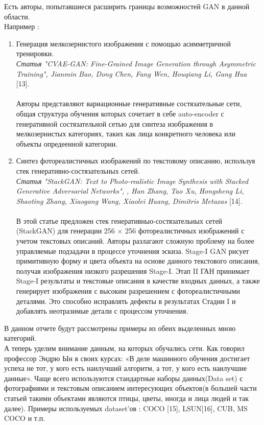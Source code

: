 \documentclass{article}
\begin{document}
    Есть авторы, попытавшиеся расширить границы возможностей GAN в данной области. \\ Например :
\begin{enumerate} 
\item Генерация мелкозернистого изображения с помощью асимметричной тренировки. \\ 
    \textit{Статья "CVAE-GAN: Fine-Grained Image Generation through Asymmetric Training", Jianmin Bao, Dong Chen, Fang Wen, Houqiang Li, Gang Hua} [13].\\ \\
    Авторы представляют вариационные генеративные состязательные сети, общая структура обучения которых сочетает в себе auto-encoder с генеративной состязательной сетью для синтеза изображения в мелкозернистых категориях, таких как лица конкретного человека или объекты опредеенной категории. \\
\item Синтез фотореалистичных изображений по текстовому описанию, используя стек генеративно-состязательных сетей. \\ 
    \textit{Статья "StackGAN: Text to Photo-realistic Image Synthesis with Stacked Generative Adversarial Networks", , Han Zhang, Tao Xu, Hongsheng Li, Shaoting Zhang, Xiaogang Wang, Xiaolei Huang, Dimitris Metaxas} [14]. \\ \\
    В этой статье предложен стек
генеративныо-состязательных сетей (StackGAN) для генерации
256 × 256 фотореалистичных изображений с учетом текстовых описаний. Авторы разлагают сложную проблему на более управляемые подзадачи в процессе уточнения эскиза. Stage-I GAN рисует примитивную форму и цвета
объекта на основе данного текстового описания, получая изображения низкого разрешения Stage-I. Этап II ГАН принимает
Stage-I результаты и текстовые описания в качестве входных данных, а также генерирует изображения с высоким разрешением с фотореалистичными деталями. Это
способно исправлять дефекты в результатах Стадии I и добавлять неотразимые детали с процессом уточнения. \\
    \end{enumerate} 
    В данном отчете будут рассмотрены примеры из обеих выделенных мною категорий.\\
    А теперь уделим внимание данным, на которых обучались сети. Как говорил профессор Эндрю Ын в своих курсах: «В деле машинного обучения достигает успеха не тот, у кого есть наилучший алгоритм, а тот, у кого есть наилучшие данные». 
    Чаще всего используются стандартные наборы данных(Data set) с фотографиями и текстовым описанием интересующих объектов(в большей части статьей такими объектами являются птицы, цветы, иногда и лица людей и так далее). Примеры используемых dataset'ов : COCO [15], LSUN[16], CUB, MS COCO и т.п.\\ \\
\end{document}

